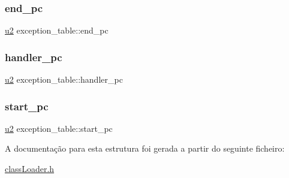 \mbox{\label{structexception__table_aeb4c86c92f02d6fccd52a0a9be9c5dac}} 
\subsubsection{\texorpdfstring{end\+\_\+pc}{end\_pc}}
{\footnotesize\ttfamily \hyperlink{util_8h_a55ef8d87fd202b8417704c089899c5b9}{u2} exception\+\_\+table\+::end\+\_\+pc}

\mbox{\label{structexception__table_a8fe6fb5063598ad0d48aab5e617d6a35}} 
\subsubsection{\texorpdfstring{handler\+\_\+pc}{handler\_pc}}
{\footnotesize\ttfamily \hyperlink{util_8h_a55ef8d87fd202b8417704c089899c5b9}{u2} exception\+\_\+table\+::handler\+\_\+pc}

\mbox{\label{structexception__table_a63da93a2b0f5dc61b3a158a0c7384602}} 
\subsubsection{\texorpdfstring{start\+\_\+pc}{start\_pc}}
{\footnotesize\ttfamily \hyperlink{util_8h_a55ef8d87fd202b8417704c089899c5b9}{u2} exception\+\_\+table\+::start\+\_\+pc}



A documentação para esta estrutura foi gerada a partir do seguinte ficheiro\+:\begin{DoxyCompactItemize}
\item 
\hyperlink{class_loader_8h}{class\+Loader.\+h}\end{DoxyCompactItemize}
